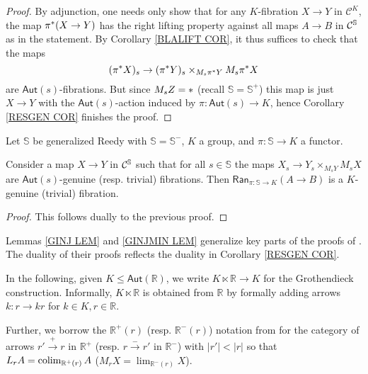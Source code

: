 \documentclass[a4paper,10pt
,draft
]{article}%
\begin{document}
\begin{proof}
By adjunction, one needs only show that for any 
$K$-fibration $X \to Y$ in $\mathcal{C}^K$,
the map $\pi^{\**}(X \to Y)$
has the right lifting property against all maps $A \to B$ in $\mathcal{C}^{\mathbb{S}}$ as in the statement.
By Corollary \ref{BLALIFT COR}, it thus suffices to check
that the maps
\[
	(\pi^{\**} X)_s \to 
	(\pi^{\**} Y)_s \times_{M_s \pi^{\**} Y} M_s \pi^{\**} X
\]
are $\mathsf{Aut}(s)$-fibrations. But since $M_s Z = \**$ 
(recall $\mathbb{S}=\mathbb{S}^+$)
this map is just $X \to Y$ with the $\mathsf{Aut}(s)$-action induced by
$\pi \colon \mathsf{Aut}(s) \to K$, hence 
Corollary \ref{RESGEN COR} finishes the proof.
\end{proof}


\begin{lemma}\label{GINJMIN LEM}
Let $\mathbb{S}$ be generalized Reedy with $\mathbb{S}=\mathbb{S}^-$, $K$ a group, and $\pi \colon \mathbb{S} \to K$ a functor.

Consider a map $X \to Y$ in $\mathcal{C}^{\mathbb{S}}$ such that for all 
$s \in \mathbb{S}$
the maps 
$
	X_s \to Y_s \times_{M_s Y} M_s X
$	
are $\mathsf{Aut}(s)$-genuine (resp. trivial) fibrations.
Then 
$\mathsf{Ran}_{\pi\colon \mathbb{S} \to K}(A \to B)$
is a $K$-genuine (trivial) fibration.
\end{lemma}

\begin{proof}
This follows dually to the previous proof.
\end{proof}

\begin{remark}
Lemmas \ref{GINJ LEM} and \ref{GINJMIN LEM} generalize key parts of the proofs of \cite[Lemmas 5.3 and 5.5]{BM11}.  
The duality of their proofs reflects the duality in 
Corollary \ref{RESGEN COR}.
\end{remark}

In the following, given $K \leq \mathsf{Aut}(\mathbb{R})$,
we write $K \ltimes \mathbb{R} \to K$ for the Grothendieck construction. Informally, 
$K \ltimes \mathbb{R}$ is obtained from $\mathbb{R}$
by formally adding arrows $k \colon r \to k r$ for 
$k\in K, r \in \mathbb{R}$.

Further, we borrow the $\mathbb{R}^+(r)$ (resp. $\mathbb{R}^-(r)$) notation from \cite{BM11} for
the category of arrows
$r' \xrightarrow{+} r$ in $\mathbb{R}^+$
(resp. 
$r \xrightarrow{-} r'$ in $\mathbb{R}^-$)
with $|r'|<|r|$
so that
$L_r A = \mathop{\operatorname{colim}}_{\mathbb{R}^+(r)}A$
($M_r X = \mathop{\lim}_{\mathbb{R}^-(r)}X$).
\end{document}
